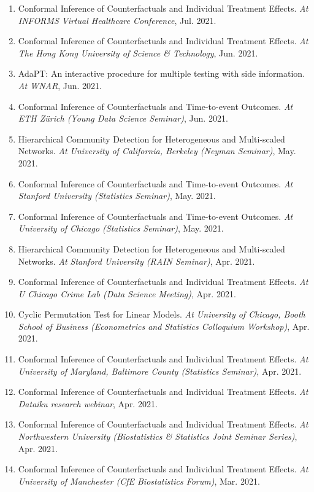\documentclass{article}
\begin{document}
\begin{enumerate}
\item Conformal Inference of Counterfactuals and Individual Treatment Effects. \emph{At INFORMS Virtual Healthcare Conference}, Jul. 2021.
\item Conformal Inference of Counterfactuals and Individual Treatment Effects. \emph{At The Hong Kong University of Science \& Technology}, Jun. 2021.
\item AdaPT: An interactive procedure for multiple testing with side information. \emph{At WNAR}, Jun. 2021.
\item Conformal Inference of Counterfactuals and Time-to-event Outcomes. \emph{At ETH Z\"{u}rich (Young Data Science Seminar)}, Jun. 2021.
\item Hierarchical Community Detection for Heterogeneous and Multi-scaled Networks. \emph{At University of California, Berkeley (Neyman Seminar)}, May. 2021.
\item Conformal Inference of Counterfactuals and Time-to-event Outcomes. \emph{At Stanford University (Statistics Seminar)}, May. 2021.
\item Conformal Inference of Counterfactuals and Time-to-event Outcomes. \emph{At University of Chicago (Statistics Seminar)}, May. 2021.
\item Hierarchical Community Detection for Heterogeneous and Multi-scaled Networks. \emph{At Stanford University (RAIN Seminar)}, Apr. 2021.
\item Conformal Inference of Counterfactuals and Individual Treatment Effects. \emph{At U Chicago Crime Lab (Data Science Meeting)}, Apr. 2021.
\item Cyclic Permutation Test for Linear Models. \emph{At University of Chicago, Booth School of Business (Econometrics and Statistics Colloquium Workshop)}, Apr. 2021.
\item Conformal Inference of Counterfactuals and Individual Treatment Effects. \emph{At University of Maryland, Baltimore County (Statistics Seminar)}, Apr. 2021.
\item Conformal Inference of Counterfactuals and Individual Treatment Effects. \emph{At Dataiku research webinar}, Apr. 2021.
\item Conformal Inference of Counterfactuals and Individual Treatment Effects. \emph{At Northwestern University (Biostatistics \& Statistics Joint Seminar Series)}, Apr. 2021.
\item Conformal Inference of Counterfactuals and Individual Treatment Effects. \emph{At University of Manchester (CfE Biostatistics Forum)}, Mar. 2021.

\end{enumerate}
\end{document}
